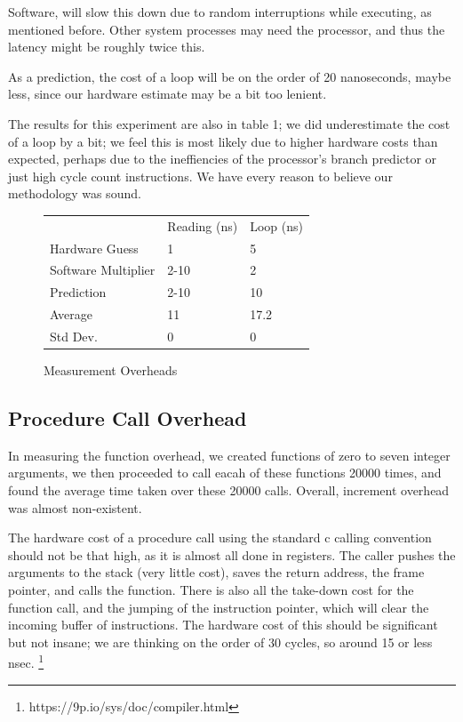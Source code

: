 \documentclass[letterpaper,twocolumn,10pt]{article}
\begin{document}
Software, will slow this down due to random interruptions while executing, as mentioned before.
Other system processes may need the processor, and thus the latency might be roughly twice 
this.

As a prediction, the cost of a loop will be on the order of 20 nanoseconds, maybe less, since
our hardware estimate may be a bit too lenient.

The results for this experiment are also in table 1; we did underestimate the cost of a loop by a bit;
we feel this is most likely due to higher hardware costs than expected, perhaps due to the ineffiencies
of the processor's branch predictor or just high cycle count instructions. We have every reason to believe our methodology was sound.

\begin{figure}
	\centering
    \begin{tabular}{lll}
      & Reading (ns) & Loop (ns) \\
Hardware Guess  & 1 & 5\\
Software Multiplier & 2-10 & 2 \\
Prediction & 2-10 & 10\\
Average  & 11 & 17.2 \\
Std Dev. & 0 & 0
\end{tabular}
\caption{Measurement Overheads}
\label{tab:generaloverheads}
\end{figure}


\subsection{Procedure Call Overhead}

In measuring the function overhead, we created functions of zero to seven integer arguments,
we then proceeded to call eacah of these functions 20000 times, and found the average time taken over these 20000 calls. Overall, increment overhead was almost non-existent.

The hardware cost of a procedure call using the standard c calling convention should not be that high, as it is almost all done in registers. The caller pushes the arguments to the stack (very little cost), saves the return address, the frame pointer, and calls the function. There is also all the take-down cost for the function call, and the jumping of the instruction pointer, which will clear the incoming buffer of instructions. The hardware cost of this should be significant but not insane; we
are thinking on the order of 30 cycles, so around 15 or less nsec.
\footnote{https://9p.io/sys/doc/compiler.html}
\end{document}
